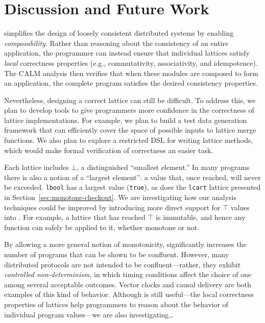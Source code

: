 \section{Discussion and Future Work}
\label{sec:discussion}

\lang simplifies the design of loosely consistent distributed systems by
enabling \emph{composability}. Rather than reasoning about the consistency of an
entire application, the programmer can instead ensure that individual lattices
satisfy \emph{local} correctness properties (e.g., commutativity, associativity,
and idempotence). The CALM analysis then verifies that when these modules are
composed to form an application, the complete program satisfies the desired
consistency properties.

Nevertheless, designing a correct lattice can still be difficult. To address
this, we plan to develop tools to give programmers more confidence in the
correctness of lattice implementations. For example, we plan to build a test
data generation framework that can efficiently cover the space of possible
inputs to lattice merge functions. We also plan to explore a restricted DSL for
writing lattice methods, which would make formal verification of correctness an
easier task.

Each lattice includes $\bot$, a distinguished ``smallest element.'' In many
programs there is also a notion of a ``largest element'': a value that, once
reached, will never be exceeded. \texttt{lbool} has a largest value
(\texttt{true}), as does the \texttt{lcart} lattice presented in
Section~\ref{sec:monotone-checkout}. We are investigating how our analysis
techniques could be improved by introducing more direct support for $\top$
values into \lang. For example, a lattice that has reached $\top$ is immutable,
and hence any function can safely be applied to it, whether monotone or not.

By allowing a more general notion of monotonicity, \lang significantly increases
the number of programs that can be shown to be confluent. However, many
distributed protocols are not intended to be confluent---rather, they exhibit
\emph{controlled non-determinism}, in which timing conditions affect the choice
of one among several acceptable outcomes. Vector clocks and causal delivery are
both examples of this kind of behavior. Although \lang is still useful---the
local correctness properties of lattices help programmers to reason about the
behavior of individual program values---we are also investigating\ldots

